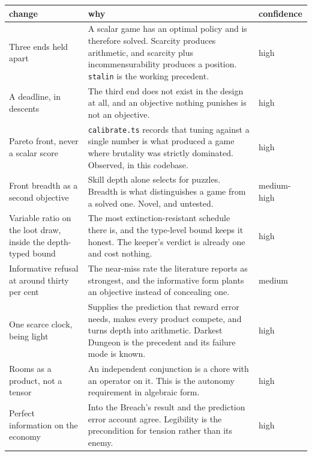 \documentclass[11pt,a4paper]{article}
\begin{document}
\small
\begin{center}
\begin{tabular}{@{}>{\raggedright\arraybackslash}p{}@{\hspace{3mm}}>{\raggedright\arraybackslash}p{}@{\hspace{3mm}}>{\raggedright\arraybackslash}p{}@{}}
\toprule
\textbf{change} & \textbf{why} & \textbf{confidence} \\
\midrule
Three ends held apart &
A scalar game has an optimal policy and is therefore solved. Scarcity produces arithmetic, and
scarcity plus incommensurability produces a position. \texttt{stalin} is the working precedent. &
high \\[2mm]
A deadline, in descents &
The third end does not exist in the design at all, and an objective nothing punishes is not an
objective. &
high \\[2mm]
Pareto front, never a scalar score &
\texttt{calibrate.ts} records that tuning against a single number is what produced a game where
brutality was strictly dominated. Observed, in this codebase. &
high \\[2mm]
Front breadth as a second objective &
Skill depth alone selects for puzzles. Breadth is what distinguishes a game from a solved one.
Novel, and untested. &
medium-high \\[2mm]
Variable ratio on the loot draw, inside the depth-typed bound &
The most extinction-resistant schedule there is, and the type-level bound keeps it honest. The
keeper's verdict is already one and cost nothing. &
high \\[2mm]
Informative refusal at around thirty per cent &
The near-miss rate the literature reports as strongest, and the informative form plants an
objective instead of concealing one. &
medium \\[2mm]
One scarce clock, being light &
Supplies the prediction that reward error needs, makes every product compete, and turns depth
into arithmetic. Darkest Dungeon is the precedent and its failure mode is known. &
high \\[2mm]
Rooms as a product, not a tensor &
An independent conjunction is a chore with an operator on it. This is the autonomy requirement
in algebraic form. &
high \\[2mm]
Perfect information on the economy &
Into the Breach's result and the prediction error account agree. Legibility is the precondition
for tension rather than its enemy. &
high \\[2mm]
\bottomrule
\end{tabular}
\end{center}
\end{document}
